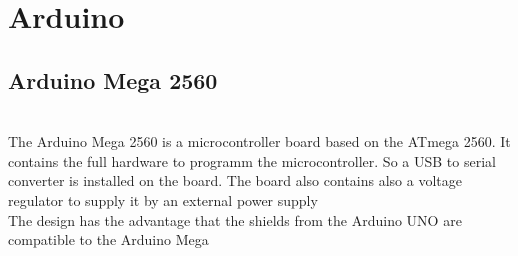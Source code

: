 \documentclass[english, 10pt]{report}
\begin{document}
\section{Arduino}
\subsection{Arduino Mega 2560}
\\
The Arduino Mega 2560 is a microcontroller board based on the ATmega 2560.
It contains the full hardware to programm the microcontroller.
So a USB to serial converter is installed on the board.
The board also contains also a voltage regulator to supply it by an external power supply
\\
The design has the advantage that the shields from the Arduino UNO are compatible to the Arduino Mega
\end{document}
